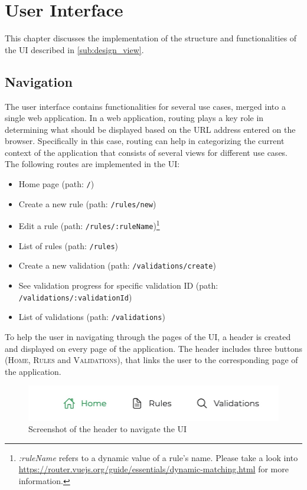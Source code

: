 \section{User Interface}

  This chapter discusses the implementation of the structure and functionalities of the UI described in \autoref{sub:design_view}.

  \subsection{Navigation}
  
    The user interface contains functionalities for several use cases, merged into a single web application. In a web application, routing plays a key role in determining what should be displayed based on the URL address entered on the browser. Specifically in this case, routing can help in categorizing the current context of the application that consists of several views for different use cases. The following routes are implemented in the UI:

    \begin{itemize}
     \item Home page (path: \verb;/;)
     \item Create a new rule (path: \verb;/rules/new;)
     \item Edit a rule (path: \verb;/rules/:ruleName;)\footnote{\emph{:ruleName} refers to a dynamic value of a rule's name. Please take a look into \url{https://router.vuejs.org/guide/essentials/dynamic-matching.html} for more information.}
     \item List of rules (path: \verb;/rules;)
     \item Create a new validation (path: \verb;/validations/create;)
     \item See validation progress for specific validation ID (path: \verb;/validations/:validationId;)
     \item List of validations (path: \verb;/validations;)
    \end{itemize}
    
    To help the user in navigating through the pages of the UI, a header is created and displayed on every page of the application. The header includes three buttons (\textsc{Home, Rules} and \textsc{Validations}), that links the user to the corresponding page of the application. 

    \begin{figure}[!ht]
     \includegraphics[width=\textwidth]{images/ss_navigation.jpeg}
     \caption{Screenshot of the header to navigate the UI}
    \end{figure}

